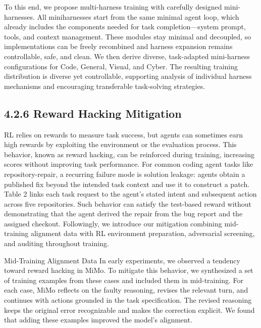 \documentclass[
  10
]{article}
\begin{document}
To this end, we propose multi-harness training with carefully designed
mini-harnesses. All miniharnesses start from the same minimal agent
loop, which already includes the components needed for task
completion---system prompt, tools, and context management. These modules
stay minimal and decoupled, so implementations can be freely recombined
and harness expansion remains controllable, safe, and clean. We then
derive diverse, task-adapted mini-harness configurations for Code,
General, Visual, and Cyber. The resulting training distribution is
diverse yet controllable, supporting analysis of individual harness
mechanisms and encouraging transferable task-solving strategies.

\subsection{4.2.6 Reward Hacking
Mitigation}\label{reward-hacking-mitigation}

RL relies on rewards to measure task success, but agents can sometimes
earn high rewards by exploiting the environment or the evaluation
process. This behavior, known as reward hacking, can be reinforced
during training, increasing scores without improving task performance.
For common coding agent tasks like repository-repair, a recurring
failure mode is solution leakage: agents obtain a published fix beyond
the intended task context and use it to construct a patch. Table 2 links
each task request to the agent's stated intent and subsequent action
across five repositories. Such behavior can satisfy the test-based
reward without demonstrating that the agent derived the repair from the
bug report and the assigned checkout. Followingly, we introduce our
mitigation combining mid-training alignment data with RL environment
preparation, adversarial screening, and auditing throughout training.

Mid-Training Alignment Data In early experiments, we observed a tendency
toward reward hacking in MiMo. To mitigate this behavior, we synthesized
a set of training examples from these cases and included them in
mid-training. For each case, MiMo reflects on the faulty reasoning,
revises the relevant turn, and continues with actions grounded in the
task specification. The revised reasoning keeps the original error
recognizable and makes the correction explicit. We found that adding
these examples improved the model's alignment.
\end{document}
